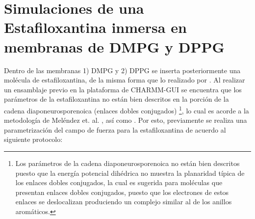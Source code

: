 \section{Simulaciones de una Estafiloxantina inmersa en membranas de DMPG y DPPG } \label{sec:1stxpg}
Dentro de las membranas 1) DMPG y 2) DPPG se inserta posteriormente una mol\'{e}cula de estafiloxantina, de la misma forma que lo realizado por \cite{Melendez-Delgado2018StudyingBilayers}. Al realizar un ensamblaje previo en la plataforma de CHARMM-GUI \cite{Brooks2009} se encuentra que los par\'{a}metros de la estafiloxantina no est\'{a}n bien descritos en la porci\'{o}n de la cadena diaponeurosporenoica (enlaces dobles conjugados) \footnote{Los par\'{a}metros de la cadena diaponeurosporenoica no est\'{a}n bien descritos puesto que la energ\'{i}a potencial dih\'{e}drica no muestra la planaridad t\'{i}pica de los enlaces dobles conjugados, la cual es sugerida para mol\'{e}culas que presentan enlaces dobles conjugados, puesto que los electrones de estos enlaces se deslocalizan produciendo un complejo similar al de los anillos arom\'{a}ticos.}, lo cual es acorde a la metodolog\'{i}a de Mel\'{e}ndez et. al. \cite{Melendez-Delgado2018StudyingBilayers}, as\'{i} como \cite{Grudzinski2017LocalizationBilayer}. Por esto, previamente se realiza una parametrizaci\'{o}n del campo de fuerza para la estafiloxantina de acuerdo al siguiente protocolo:\\


